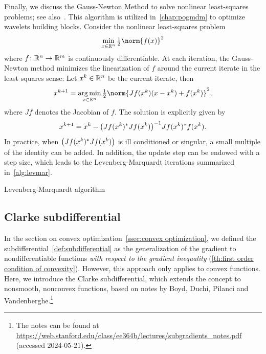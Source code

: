 Finally, we discuss the Gauss-Newton Method to solve nonlinear least-squares problems; see also~\cite[section 1.5.1]{bertsekas_nonlinear_1999}.
This algorithm is utilized in~\cref{chap:pogmdm} to optimize wavelets building blocks.
Consider the nonlinear least-squares problem
\begin{equation}
	\min_{x\in\R^n} \Half \norm{f(x)}^{\num{2}}
\end{equation}
where \( f \colon \mathbb{R}^n \to \mathbb{R}^m \) is continuously differentiable.
At each iteration, the Gauss-Newton method minimizes the linearization of \( f \) around the current iterate in the least squares sense:
Let \( x^k \in \mathbb{R}^n \) be the current iterate, then
\begin{equation}
	x^{k+\num{1}} = \argmin_{x \in \R^n} \Half \norm{ J f(x^k) (x - x^k) + f(x^k)}^{\num{2}},
\end{equation}
where \( J f \) denotes the Jacobian of \( f \).
The solution is explicitly given by
\begin{equation}
	x^{k+\num{1}} = x^k - \bigl(J f(x^k)^{\ast} J f(x^k)\bigr)^{\num{-1}} J f(x^k)^{\ast} f(x^k).
\end{equation}
In practice, when \( \bigl(J f(x^k)^{\ast} J f(x^k)\bigr) \) is ill conditioned or singular, a small multiple of the identity can be added.
In addition, the update step can be endowed with a step size, which leads to the Levenberg-Marquardt iterations summarized in~\cref{alg:levmar}.
\begin{algorithm}
	\DontPrintSemicolon
	\caption{Levenberg-Marquardt algorithm}
	\label{alg:levmar}
\end{algorithm}
\subsection{Clarke subdifferential}
In the section on convex optimization~\cref{ssec:convex optimization}, we defined the subdifferential~\cref{def:subdifferential} as the generalization of the gradient to nondifferentiable functions \emph{with respect to the gradient inequality} (\cref{th:first order condition of convexity}).
However, this approach only applies to convex functions.
Here, we introduce the Clarke subdifferential, which extends the concept to nonsmooth, nonconvex functions, based on notes by Boyd, Duchi, Pilanci and Vandenberghe.\footnote{%
	The notes can be found at \url{https://web.stanford.edu/class/ee364b/lectures/subgradients_notes.pdf} (accessed 2024-05-21).
}

